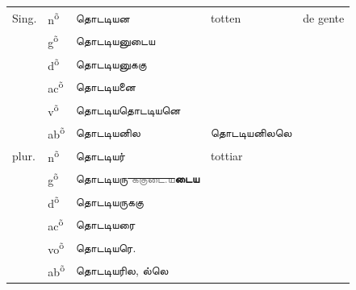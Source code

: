 \documentclass[12pt,a4paper]{scrbook}
\begin{document}
      
\begin{tabular}{lllll}
    
        
          Sing. &
          n\textsuperscript{õ} &
          தொடடியன &
          totten &
          de gente \\
    
        
    
        
           &
          g\textsuperscript{õ} &
          தொடடியனுடைய \\
    
        
    
        
           &
          d\textsuperscript{õ} &
          தொடடியனுககு \\
    
        
    
        
           &
          ac\textsuperscript{õ} &
          தொடடியனை \\
    
        
    
        
           &
          v\textsuperscript{õ} &
          தொடடியதொடடியனெ \\
    
        
    
        
           &
          ab\textsuperscript{õ} &
          தொடடியனில &
          தொடடியனிலலெ \\
    
        
    
        
          plur. &
          n\textsuperscript{õ} &
          தொடடியர் &
          tottiar \\
    
        
    
        
           &
          g\textsuperscript{õ} &
          தொடடியரு\sout{\textcolor{gray}{ ககுடை.ய}}\textbf{டைய} \\
    
        
    
        
           &
          d\textsuperscript{õ} &
          தொடடியருககு \\
    
        
    
        
           &
          ac\textsuperscript{õ} &
          தொடடியரை \\
    
        
    
        
           &
          vo\textsuperscript{õ} &
          தொடடியரெ. \\
    
        
    
        
           &
          ab\textsuperscript{õ} &
          தொடடியரில, ல்லெ \\
    
        
    
      
\end{tabular}
    
\end{document}
